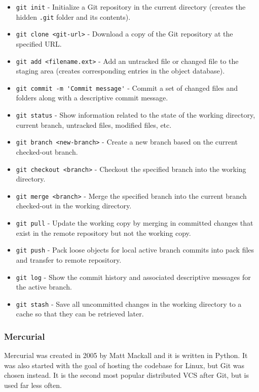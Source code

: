 \begin{itemize}
    \item \lstinline{git init} - Initialize a Git repository in the current directory (creates the hidden \lstinline{.git} folder and its contents).
    \item \lstinline{git clone <git-url>} - Download a copy of the Git repository at the specified URL.
    \item \lstinline{git add <filename.ext>} - Add an untracked file or changed file to the staging area (creates corresponding entries in the object database).
    \item \lstinline{git commit -m 'Commit message'} - Commit a set of changed files and folders along with a descriptive commit message.
    \item \lstinline{git status} - Show information related to the state of the working directory, current branch, untracked files, modified files, etc.
    \item \lstinline{git branch <new-branch>} - Create a new branch based on the current checked-out branch.
    \item \lstinline{git checkout <branch>} - Checkout the specified branch into the working directory.
    \item \lstinline{git merge <branch>} - Merge the specified branch into the current branch checked-out in the working directory.
    \item \lstinline{git pull} - Update the working copy by merging in committed changes that exist in the remote repository but not the working copy.
    \item \lstinline{git push} - Pack loose objects for local active branch commits into pack files and transfer to remote repository.
    \item \lstinline{git log} - Show the commit history and associated descriptive messages for the active branch.
    \item \lstinline{git stash} - Save all uncommitted changes in the working directory to a cache so that they can be retrieved later.
\end{itemize}

\subsubsection{Mercurial}
Mercurial was created in 2005 by Matt Mackall and it is written in Python. It was also started with the goal of hosting the codebase for Linux, but Git was chosen instead. It is the second most popular distributed VCS after Git, but is used far less often.
